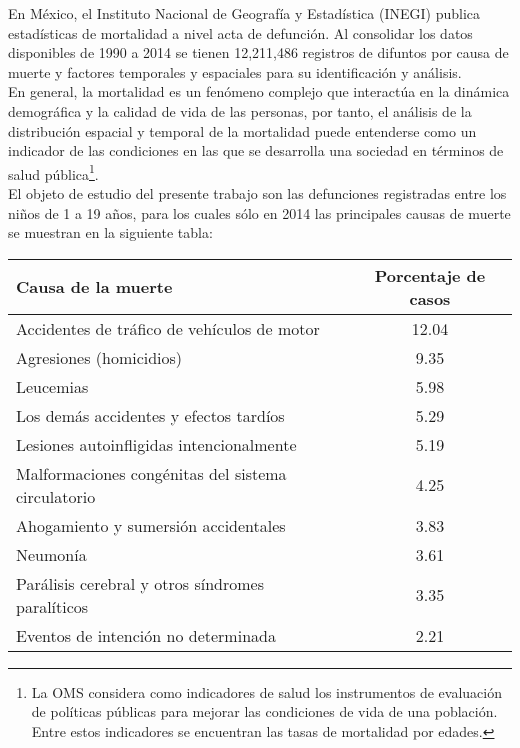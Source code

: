 \documentclass[11pt, oneside]{book}
\begin{document}
En México, el Instituto Nacional de Geografía y Estadística (INEGI) publica estadísticas de mortalidad a nivel acta de defunción. Al consolidar los datos disponibles de 1990 a 2014 se tienen 12,211,486 registros de difuntos por causa de muerte y factores temporales y espaciales para su identificación y análisis.\\ 

En general, la mortalidad es un fenómeno complejo que interactúa en la dinámica demográfica y la calidad de vida de las personas, por tanto, el análisis de la distribución espacial y temporal de la mortalidad puede entenderse como un indicador de las condiciones en las que se desarrolla una sociedad en términos de salud pública\footnote{La OMS considera como indicadores de salud los instrumentos de evaluación de políticas públicas para mejorar las condiciones de vida de una población. Entre estos indicadores se encuentran las tasas de mortalidad por edades.}.\\

El objeto de estudio del presente trabajo son las defunciones registradas entre los niños de 1 a 19 años, para los cuales sólo en 2014 las principales causas de muerte se muestran en la siguiente tabla:\\

\begingroup
    \fontsize{10pt}{12pt}\selectfont
	\begin{center}
	   \begin{tabular}{ | p{6cm} | c |}
	    \hline
	    \textbf{Causa de la muerte} & \textbf{Porcentaje de casos} \\ \hline
		Accidentes de tráfico de vehículos de motor & 12.04 \\ \hline
		Agresiones (homicidios)                     & 9.35 \\ \hline
		Leucemias                                   & 5.98 \\ \hline
		Los demás accidentes y efectos tardíos      & 5.29 \\ \hline
		Lesiones autoinfligidas intencionalmente    & 5.19 \\ \hline		
		Malformaciones congénitas del sistema circulatorio & 4.25 \\ \hline
		Ahogamiento y sumersión accidentales        & 3.83 \\ \hline
		Neumonía                                    & 3.61 \\ \hline
		Parálisis cerebral y otros síndromes paralíticos   & 3.35 \\ \hline
		Eventos de intención no determinada         & 2.21 \\ \hline		
	    \end{tabular}
	\end{center}
\endgroup
\end{document}
